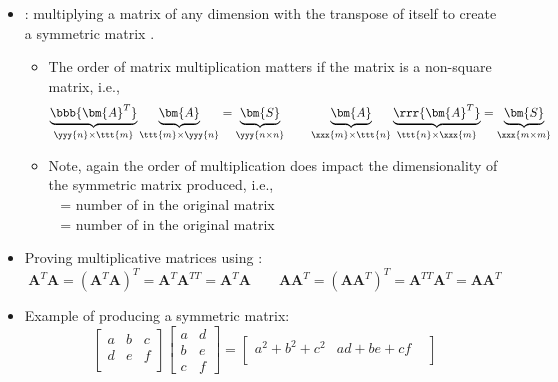 \begin{itemize}
\begin{itemize}
    \item {}: multiplying a matrix  of any dimension with the transpose of itself to create a symmetric matrix .
      \begin{itemize}
        \item The order of matrix multiplication matters if the matrix is a non-square matrix, i.e.,
        \[%
        \underbrace{\bbb{\bm{A}^T}}_{\yyy{n} \times \ttt{m}} 
          \underbrace{\bm{A}}_{\ttt{m} \times \yyy{n}} = \underbrace{\bm{S}}_{\yyy{n \times n}}
          \qquad
          \underbrace{\bm{A}}_{\xxx{m} \times \ttt{n}} 
          \underbrace{\rrr{\bm{A}^T}}_{\ttt{n} \times \xxx{m}} = \underbrace{\bm{S}}_{\xxx{m \times m}}
        \]%
        \item Note, again the order of multiplication does impact the dimensionality of the symmetric matrix produced, i.e.,\\
         \to~ = number of  in the original matrix
        \\
         \to~ = number of  in the original matrix
      \end{itemize}
      \item Proving multiplicative matrices using \hyperref[Order of Operations]{}:
      \[%
      \bm{A}^T \bm{A} = (\bm{A}^T \bm{A})^T = \bm{A}^T \bm{A}^{TT} = \bm{A}^T\bm{A}  %
        \qquad
        \bm{A}\bm{A}^T = (\bm{A}\bm{A}^T)^T = \bm{A}^{TT}\bm{A}^T = \bm{A}\bm{A}^T %
      \]%
      \item Example of producing a symmetric matrix:
      \[%
      \begin{bmatrix}
      a & b & c \\
      d & e & f \\
      \end{bmatrix}
      \begin{bmatrix}
      a & d \\
      b & e \\
      c & f   
      \end{bmatrix}
      =
      \begin{bmatrix}
      a^2+b^2+c^2 & ad+be+cf & \\

\end{bmatrix}\]
\end{itemize}
\end{itemize}
